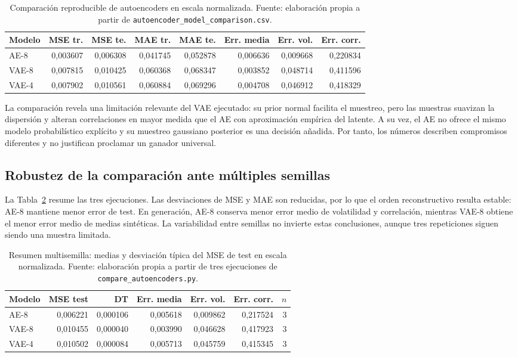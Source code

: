 \begin{table}[htbp]
\centering
\scriptsize
\begin{tabular}{lrrrrrrr}
\toprule
Modelo & MSE tr. & MSE te. & MAE tr. & MAE te. & Err. media & Err. vol. & Err. corr. \\
\midrule
AE-8 & 0,003607 & 0,006308 & 0,041745 & 0,052878 & 0,006636 & 0,009668 & 0,220834 \\
VAE-8 & 0,007815 & 0,010425 & 0,060368 & 0,068347 & 0,003852 & 0,048714 & 0,411596 \\
VAE-4 & 0,007902 & 0,010561 & 0,060884 & 0,069296 & 0,004708 & 0,046912 & 0,418329 \\
\bottomrule
\end{tabular}
\caption{Comparación reproducible de autoencoders en escala normalizada. Fuente: elaboración propia a partir de \texttt{autoencoder\_model\_comparison.csv}.}
\label{tab:comparacion_autoencoders}
\end{table}

La comparación revela una limitación relevante del VAE ejecutado: su prior normal facilita el muestreo, pero las muestras suavizan la dispersión y alteran correlaciones en mayor medida que el AE con aproximación empírica del latente. A su vez, el AE no ofrece el mismo modelo probabilístico explícito y su muestreo gaussiano posterior es una decisión añadida. Por tanto, los números describen compromisos diferentes y no justifican proclamar un ganador universal.

\subsection{Robustez de la comparación ante múltiples semillas}

La Tabla~\ref{tab:comparacion_autoencoders_multisemilla} resume las tres ejecuciones. Las desviaciones de MSE y MAE son reducidas, por lo que el orden reconstructivo resulta estable: AE-8 mantiene menor error de test. En generación, AE-8 conserva menor error medio de volatilidad y correlación, mientras VAE-8 obtiene el menor error medio de medias sintéticas. La variabilidad entre semillas no invierte estas conclusiones, aunque tres repeticiones siguen siendo una muestra limitada.

\begin{table}[htbp]
\centering
\scriptsize
\begin{tabular}{lrrrrrr}
\toprule
Modelo & MSE test & DT & Err. media & Err. vol. & Err. corr. & $n$ \\
\midrule
AE-8  & 0,006221 & 0,000106 & 0,005618 & 0,009862 & 0,217524 & 3 \\
VAE-8 & 0,010455 & 0,000040 & 0,003990 & 0,046628 & 0,417923 & 3 \\
VAE-4 & 0,010502 & 0,000084 & 0,005713 & 0,045759 & 0,415345 & 3 \\
\bottomrule
\end{tabular}
\caption{Resumen multisemilla: medias y desviación típica del MSE de test en escala normalizada. Fuente: elaboración propia a partir de tres ejecuciones de \texttt{compare\_autoencoders.py}.}
\label{tab:comparacion_autoencoders_multisemilla}
\end{table}

